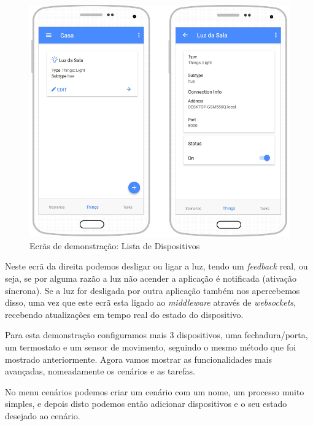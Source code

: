 \begin{figure}[H]
  \centering
        \includegraphics[scale=0.4]{img/demo/new_things_list_info.png}
  \caption{Ecrãs de demonstração: Lista de Dispositivos}
\end{figure}

Neste ecrã da direita podemos desligar ou ligar a luz, tendo um \textit{feedback} real, ou seja, se por alguma razão a luz não acender a aplicação é notificada (ativação síncrona). Se a luz for desligada por outra aplicação também nos apercebemos disso, uma vez que este ecrã esta ligado ao \textit{middleware} através de \textit{websockets}, recebendo atualizações em tempo real do estado do dispositivo.

Para esta demonstração configuramos mais 3 dispositivos, uma fechadura/porta, um termostato e um sensor de movimento, seguindo o mesmo método que foi mostrado anteriormente. Agora vamos mostrar as funcionalidades mais avançadas, nomeadamente os cenários e as tarefas.

No menu cenários podemos criar um cenário com um nome, um processo muito simples, e depois disto podemos então adicionar dispositivos e o seu estado desejado ao cenário. 

